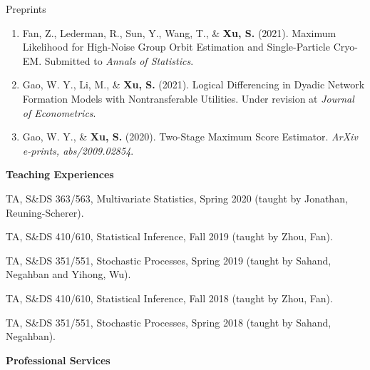 \documentclass{article}
\begin{document}
\begin{large}
\noindent Preprints
\end{large}

\begin{enumerate}

\item Fan, Z., Lederman, R., Sun, Y., Wang, T., \& \textbf{Xu, S.} (2021). Maximum Likelihood for High-Noise Group Orbit Estimation and Single-Particle Cryo-EM. Submitted to \emph{Annals of Statistics}.

\item Gao, W. Y., Li, M., \& \textbf{Xu, S.} (2021). Logical Differencing in Dyadic Network Formation Models with Nontransferable Utilities. Under revision at \emph{Journal of Econometrics}.

\item Gao, W. Y., \& \textbf{Xu, S.} (2020). Two-Stage Maximum Score Estimator. \emph{ArXiv e-prints, abs/2009.02854}.
\end{enumerate}





\vspace{5mm}
\begin{large}
\noindent \textbf{Teaching Experiences}
\end{large}
\vspace{5mm}


TA, S\&{DS} 363/563, Multivariate Statistics, Spring 2020 (taught by Jonathan, Reuning-Scherer). 

\vspace{2mm}
TA, S\&{DS} 410/610, Statistical Inference, Fall 2019 (taught by Zhou, Fan). 

\vspace{2mm}
TA, S\&{DS} 351/551, Stochastic Processes, Spring 2019 (taught by Sahand, Negahban and Yihong, Wu). 

\vspace{2mm}
TA, S\&{DS} 410/610, Statistical Inference, Fall 2018 (taught by Zhou, Fan). 

\vspace{2mm}
TA, S\&{DS} 351/551, Stochastic Processes, Spring 2018 (taught by Sahand, Negahban). 



\vspace{5mm}
\begin{large}
\noindent \textbf{Professional Services}
\end{large}
\vspace{5mm}
\end{document}

